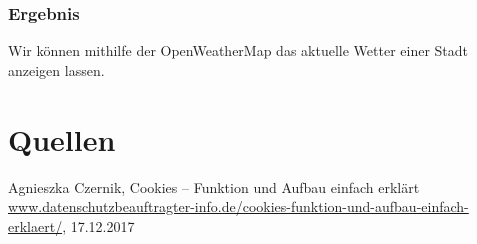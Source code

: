 \subsubsection{Ergebnis}

Wir können mithilfe der OpenWeatherMap das aktuelle Wetter einer Stadt anzeigen lassen.

\section{Quellen}
\begin{thebibliography}{999}
 Agnieszka Czernik, Cookies – Funktion und Aufbau einfach erklärt \\ \url{www.datenschutzbeauftragter-info.de/cookies-funktion-und-aufbau-einfach-erklaert/}, 17.12.2017

\end{thebibliography}







